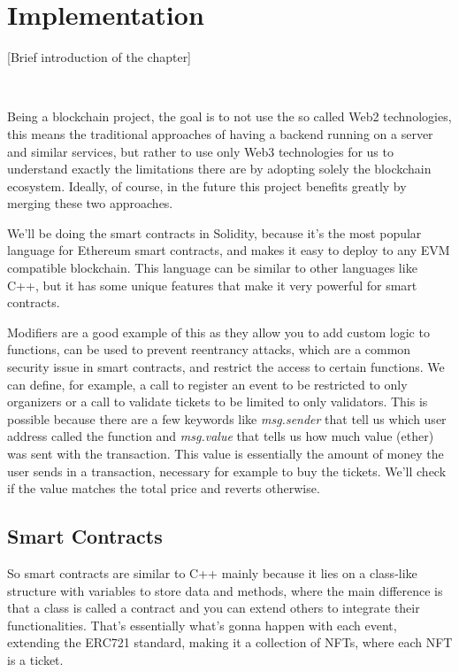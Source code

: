 \chapter{Implementation}
\label{ch:implementation}

[Brief introduction of the chapter]

~

Being a blockchain project, the goal is to not use the so called Web2 technologies, this means the traditional approaches of having a backend running on a server and similar services, but rather to use only Web3 technologies for us to understand exactly the limitations there are by adopting solely the blockchain ecosystem. Ideally, of course, in the future this project benefits greatly by merging these two approaches.

We'll be doing the smart contracts in Solidity, because it's the most popular language for Ethereum smart contracts, and makes it easy to deploy to any EVM compatible blockchain. This language can be similar to other languages like C++, but it has some unique features that make it very powerful for smart contracts.

Modifiers are a good example of this as they allow you to add custom logic to functions, can be used to prevent reentrancy attacks, which are a common security issue in smart contracts, and restrict the access to certain functions. We can define, for example, a call to register an event to be restricted to only organizers or a call to validate tickets to be limited to only validators. This is possible because there are a few keywords like \textit{msg.sender} that tell us which user address called the function and \textit{msg.value} that tells us how much value (ether) was sent with the transaction. This value is essentially the amount of money the user sends in a transaction, necessary for example to buy the tickets. We'll check if the value matches the total price and reverts otherwise.

\section{Smart Contracts}
\label{sec:smart_contracts}

So smart contracts are similar to C++ mainly because it lies on a class-like structure with variables to store data and methods, where the main difference is that a class is called a contract and you can extend others to integrate their functionalities. That's essentially what's gonna happen with each event, extending the ERC721 standard, making it a collection of NFTs, where each NFT is a ticket.

